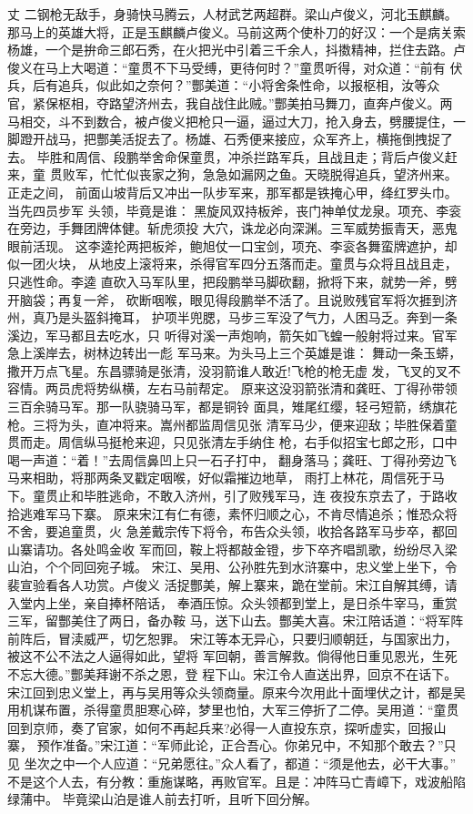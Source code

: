 丈
二钢枪无敌手，身骑快马腾云，人材武艺两超群。梁山卢俊义，河北玉麒麟。
那马上的英雄大将，正是玉麒麟卢俊义。马前这两个使朴刀的好汉：一个是病关索
杨雄，一个是拚命三郎石秀，在火把光中引着三千余人，抖擞精神，拦住去路。卢
俊义在马上大喝道：“童贯不下马受缚，更待何时？”童贯听得，对众道：“前有
伏兵，后有追兵，似此如之奈何？”酆美道：“小将舍条性命，以报枢相，汝等众
官，紧保枢相，夺路望济州去，我自战住此贼。”酆美拍马舞刀，直奔卢俊义。两
马相交，斗不到数合，被卢俊义把枪只一逼，逼过大刀，抢入身去，劈腰提住，一
脚蹬开战马，把酆美活捉去了。杨雄、石秀便来接应，众军齐上，横拖倒拽捉了去。
毕胜和周信、段鹏举舍命保童贯，冲杀拦路军兵，且战且走；背后卢俊义赶来，童
贯败军，忙忙似丧家之狗，急急如漏网之鱼。天晓脱得追兵，望济州来。正走之间，
前面山坡背后又冲出一队步军来，那军都是铁掩心甲，绛红罗头巾。当先四员步军
头领，毕竟是谁：
黑旋风双持板斧，丧门神单仗龙泉。项充、李衮在旁边，手舞团牌体健。斩虎须投
大穴，诛龙必向深渊。三军威势振青天，恶鬼眼前活现。
这李逵抡两把板斧，鲍旭仗一口宝剑，项充、李衮各舞蛮牌遮护，却似一团火块，
从地皮上滚将来，杀得官军四分五落而走。童贯与众将且战且走，只逃性命。李逵
直砍入马军队里，把段鹏举马脚砍翻，掀将下来，就势一斧，劈开脑袋；再复一斧，
砍断咽喉，眼见得段鹏举不活了。且说败残官军将次捱到济州，真乃是头盔斜掩耳，
护项半兜腮，马步三军没了气力，人困马乏。奔到一条溪边，军马都且去吃水，只
听得对溪一声炮响，箭矢如飞蝗一般射将过来。官军急上溪岸去，树林边转出一彪
军马来。为头马上三个英雄是谁：
舞动一条玉蟒，撒开万点飞星。东昌骠骑是张清，没羽箭谁人敢近!飞枪的枪无虚
发，飞叉的叉不容情。两员虎将势纵横，左右马前帮定。
原来这没羽箭张清和龚旺、丁得孙带领三百余骑马军。那一队骁骑马军，都是铜铃
面具，雉尾红缨，轻弓短箭，绣旗花枪。三将为头，直冲将来。嵩州都监周信见张
清军马少，便来迎敌；毕胜保着童贯而走。周信纵马挺枪来迎，只见张清左手纳住
枪，右手似招宝七郎之形，口中喝一声道：“着！”去周信鼻凹上只一石子打中，
翻身落马；龚旺、丁得孙旁边飞马来相助，将那两条叉戳定咽喉，好似霜摧边地草，
雨打上林花，周信死于马下。童贯止和毕胜逃命，不敢入济州，引了败残军马，连
夜投东京去了，于路收拾逃难军马下寨。
原来宋江有仁有德，素怀归顺之心，不肯尽情追杀；惟恐众将不舍，要追童贯，火
急差戴宗传下将令，布告众头领，收拾各路军马步卒，都回山寨请功。各处鸣金收
军而回，鞍上将都敲金镫，步下卒齐唱凯歌，纷纷尽入梁山泊，个个同回宛子城。
宋江、吴用、公孙胜先到水浒寨中，忠义堂上坐下，令裴宣验看各人功赏。卢俊义
活捉酆美，解上寨来，跪在堂前。宋江自解其缚，请入堂内上坐，亲自捧杯陪话，
奉酒压惊。众头领都到堂上，是日杀牛宰马，重赏三军，留酆美住了两日，备办鞍
马，送下山去。酆美大喜。宋江陪话道：“将军阵前阵后，冒渎威严，切乞恕罪。
宋江等本无异心，只要归顺朝廷，与国家出力，被这不公不法之人逼得如此，望将
军回朝，善言解救。倘得他日重见恩光，生死不忘大德。”酆美拜谢不杀之恩，登
程下山。宋江令人直送出界，回京不在话下。
宋江回到忠义堂上，再与吴用等众头领商量。原来今次用此十面埋伏之计，都是吴
用机谋布置，杀得童贯胆寒心碎，梦里也怕，大军三停折了二停。吴用道：“童贯
回到京师，奏了官家，如何不再起兵来?必得一人直投东京，探听虚实，回报山寨，
预作准备。”宋江道：“军师此论，正合吾心。你弟兄中，不知那个敢去？”只见
坐次之中一个人应道：“兄弟愿往。”众人看了，都道：“须是他去，必干大事。”
不是这个人去，有分教：重施谋略，再败官军。且是：冲阵马亡青嶂下，戏波船陷
绿蒲中。
毕竟梁山泊是谁人前去打听，且听下回分解。
